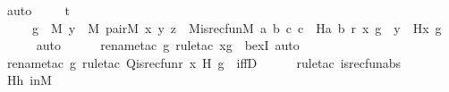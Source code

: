 \begin{isabellebody}
\ auto\ \isanewline
\ \ \isamarkupfalse%
\ t{}\ {\isacharcolon}{\kern0pt}\ \ \ \isanewline
\ \ \ \ {\isachardoublequoteopen}{\isachardot}{\kern0pt}{\isachardot}{\kern0pt}{\isachardot}{\kern0pt}\ {\isasymlongleftrightarrow}{\isacharparenleft}{\kern0pt}{\isasymexists}g\ {\isasymin}\ M{\isachardot}{\kern0pt}\ {\isasymexists}y\ {\isasymin}\ M{\isachardot}{\kern0pt}\ pair{\isacharparenleft}{\kern0pt}{\isacharhash}{\kern0pt}{\isacharhash}{\kern0pt}M{\isacharcomma}{\kern0pt}\ x{\isacharcomma}{\kern0pt}\ y{\isacharcomma}{\kern0pt}\ z{\isacharparenright}{\kern0pt}\ {\isasymand}\ M{\isacharunderscore}{\kern0pt}is{\isacharunderscore}{\kern0pt}recfun{\isacharparenleft}{\kern0pt}{\isacharhash}{\kern0pt}{\isacharhash}{\kern0pt}M{\isacharcomma}{\kern0pt}\ {\isasymlambda}a\ b\ c{\isachardot}{\kern0pt}\ c\ {\isacharequal}{\kern0pt}\ H{\isacharparenleft}{\kern0pt}a{\isacharcomma}{\kern0pt}\ b{\isacharparenright}{\kern0pt}{\isacharcomma}{\kern0pt}\ r{\isacharcomma}{\kern0pt}\ x{\isacharcomma}{\kern0pt}\ g{\isacharparenright}{\kern0pt}\ {\isasymand}\ y\ {\isacharequal}{\kern0pt}\ H{\isacharparenleft}{\kern0pt}x{\isacharcomma}{\kern0pt}\ g{\isacharparenright}{\kern0pt}{\isacharparenright}{\kern0pt}{\isachardoublequoteclose}\isanewline
\ \ \ \ \isamarkupfalse%
\ {\isacharparenleft}{\kern0pt}auto{\isacharparenright}{\kern0pt}\isanewline
\ \ \ \ \isamarkupfalse%
\ {\isacharparenleft}{\kern0pt}rename{\isacharunderscore}{\kern0pt}tac\ g{\isacharcomma}{\kern0pt}\ rule{\isacharunderscore}{\kern0pt}tac\ x{\isacharequal}{\kern0pt}{\isachardoublequoteopen}g{\isachardoublequoteclose}\ \ bexI{\isacharsemicolon}{\kern0pt}\ auto{\isacharparenright}{\kern0pt}\isanewline
\ \ \ \ \isamarkupfalse%
\ {\isacharparenleft}{\kern0pt}rename{\isacharunderscore}{\kern0pt}tac\ g{\isacharcomma}{\kern0pt}\ rule{\isacharunderscore}{\kern0pt}tac\ Q{\isacharequal}{\kern0pt}{\isachardoublequoteopen}is{\isacharunderscore}{\kern0pt}recfun{\isacharparenleft}{\kern0pt}r{\isacharcomma}{\kern0pt}\ x{\isacharcomma}{\kern0pt}\ H{\isacharcomma}{\kern0pt}\ g{\isacharparenright}{\kern0pt}{\isachardoublequoteclose}\ \ iffD{}{\isacharparenright}{\kern0pt}\isanewline
\ \ \ \ \isamarkupfalse%
\ {\isacharparenleft}{\kern0pt}rule{\isacharunderscore}{\kern0pt}tac\ is{\isacharunderscore}{\kern0pt}recfun{\isacharunderscore}{\kern0pt}abs{\isacharparenright}{\kern0pt}\isanewline
\ \ \ \ \isamarkupfalse%
\ Hh\ inM\ \isanewline
\ \ \ \ \ \ \ \ \ \ \isamarkupfalse%

\end{isabellebody}
